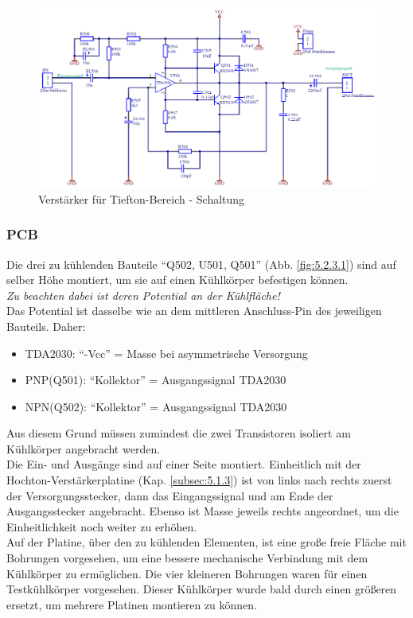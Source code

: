 \begin{figure} [H]
	\centering	
	\includegraphics[width=1\textwidth]{img/Print5/5_TTVerstaerker-Schem.PNG}
	\caption{Verstärker für Tiefton-Bereich - Schaltung}
	\label {fig:5.2.2.1}
\end{figure}

\newpage
\subsubsection{PCB}\label{subsec:5.2.3}
Die drei zu kühlenden Bauteile \enquote{Q502, U501, Q501} (Abb. \ref{fig:5.2.3.1}) sind auf selber Höhe montiert, um sie auf einen Kühlkörper befestigen können.\\
\emph{Zu beachten dabei ist deren Potential an der Kühlfläche!}\\
Das Potential ist dasselbe wie an dem mittleren Anschluss-Pin des jeweiligen Bauteils.
Daher:
\begin{itemize}
	\item TDA2030: \enquote{-Vcc} = Masse bei asymmetrische Versorgung
	\item PNP(Q501): \enquote{Kollektor} = Ausgangssignal TDA2030
	\item NPN(Q502): \enquote{Kollektor} = Ausgangssignal TDA2030
\end{itemize}

Aus diesem Grund müssen zumindest die zwei Transistoren isoliert am Kühlkörper angebracht werden.\\
Die Ein- und Ausgänge sind auf einer Seite montiert. 
Einheitlich mit der Hochton-Verstärkerplatine (Kap. \ref{subsec:5.1.3}) ist von links nach rechts zuerst der Versorgungsstecker, dann das Eingangssignal und am Ende der Ausgangsstecker angebracht.
Ebenso ist Masse jeweils rechts angeordnet, um die Einheitlichkeit noch weiter zu erhöhen.\\
Auf der Platine, über den zu kühlenden Elementen, ist eine große freie Fläche mit Bohrungen vorgesehen, um eine bessere mechanische Verbindung mit dem Kühlkörper zu ermöglichen.
Die vier kleineren Bohrungen waren für einen Testkühlkörper vorgesehen. 
Dieser Kühlkörper wurde bald durch einen größeren ersetzt, um mehrere Platinen montieren zu können.

